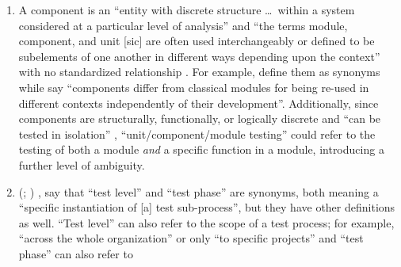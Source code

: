 \begin{enumerate}
    \item %
          A component is an ``entity with discrete structure \dots\ within a
          system considered at a particular level of analysis''
          \citep{ISO_IEC2023b} and ``the terms module, component, and unit
              [sic] are often used interchangeably or defined to be subelements
          of one another in different ways depending upon the context'' with
          no standardized relationship \citep[p.~82]{IEEE2017}. For example,
          \citetISTQB{} define them as synonyms while
          \citet[p.~107]{BaresiAndPezzè2006} say ``components
          differ from classical modules for being re-used in different contexts
          independently of their development''.
          Additionally, since components are structurally, functionally, or
          logically discrete \citep[p.~419]{IEEE2017} and ``can be tested in
          isolation'' \citepISTQB{}, ``unit/component/module testing'' could
          refer to the testing of both a module \emph{and} a specific function
          in a module, introducing a further level of
          ambiguity.
    \item %
          \citeauthor{IEEE2017} \ifnotpaper
              (\citeyear[pp.~469, 470]{IEEE2017}; \citeyear[p.~9]{IEEE2013}) \else
              \cite[pp.~469, 470]{IEEE2017}, \cite[p.~9]{IEEE2013} \fi say that
          ``test level'' and ``test phase'' are synonyms, both meaning a
          ``specific instantiation of [a] test sub-process'', but they have
          other definitions as well. ``Test level'' can also
          refer to the scope of a test process; for example, ``across the whole
          organization'' or only ``to specific projects''
          \citeyearpar[p.~24]{IEEE2022} and ``test phase'' can also refer to

\end{enumerate}

